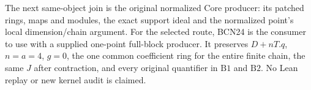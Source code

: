 The next same-object join is the original normalized
Core producer: its patched rings, maps and modules,
the exact support ideal and the normalized point's
local dimension/chain argument.  For the selected route,
BCN24 is the consumer to use with a supplied one-point
full-block producer.  It preserves \(D+nT.q\),
\(n=a=4\), \(g=0\), the one common coefficient ring for
the entire finite chain, the same \(J\) after contraction,
and every original quantifier in \(\mathrm{B1}\) and
\(\mathrm{B2}\).  No Lean replay or new kernel audit
is claimed.


